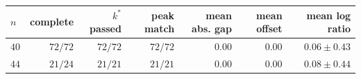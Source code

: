 \begin{tabular}{@{}lrrrrrr@{}}
  \toprule
  $n$ & complete & $k^*$ passed & peak match & mean abs. gap & mean offset & mean log ratio \\
  \midrule
  $40$ & $72/72$ & $72/72$ & $72/72$ & $0.00$ & $0.00$ & $0.06\mathbin{\pm}0.43$ \\
  $44$ & $21/24$ & $21/21$ & $21/21$ & $0.00$ & $0.00$ & $0.08\mathbin{\pm}0.44$ \\
  \bottomrule
\end{tabular}
